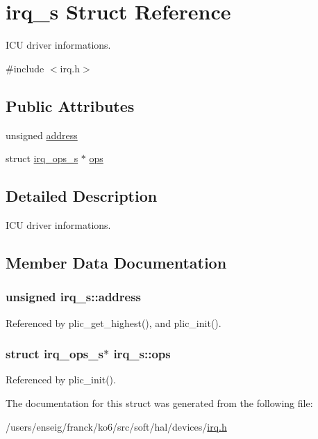 \hypertarget{structirq__s}{\section{irq\-\_\-s Struct Reference}
\label{structirq__s}
}


I\-C\-U driver informations.  




{\ttfamily \#include $<$irq.\-h$>$}

\subsection*{Public Attributes}
\begin{DoxyCompactItemize}
\item 
unsigned \hyperlink{structirq__s_a2e80a67e94ae94f89353f9e01f72aa6f}{address}
\item 
struct \hyperlink{structirq__ops__s}{irq\-\_\-ops\-\_\-s} $\ast$ \hyperlink{structirq__s_a0a694b7988310de18555fda236162d59}{ops}
\end{DoxyCompactItemize}


\subsection{Detailed Description}
I\-C\-U driver informations. 

\subsection{Member Data Documentation}
\hypertarget{structirq__s_a2e80a67e94ae94f89353f9e01f72aa6f}{
\subsubsection[{address}]{\setlength{\rightskip}{0pt plus 5cm}unsigned irq\-\_\-s\-::address}}\label{structirq__s_a2e80a67e94ae94f89353f9e01f72aa6f}


Referenced by plic\-\_\-get\-\_\-highest(), and plic\-\_\-init().

\hypertarget{structirq__s_a0a694b7988310de18555fda236162d59}{
\subsubsection[{ops}]{\setlength{\rightskip}{0pt plus 5cm}struct {\bf irq\-\_\-ops\-\_\-s}$\ast$ irq\-\_\-s\-::ops}}\label{structirq__s_a0a694b7988310de18555fda236162d59}


Referenced by plic\-\_\-init().



The documentation for this struct was generated from the following file\-:\begin{DoxyCompactItemize}
\item 
/users/enseig/franck/ko6/src/soft/hal/devices/\hyperlink{devices_2irq_8h}{irq.\-h}\end{DoxyCompactItemize}
